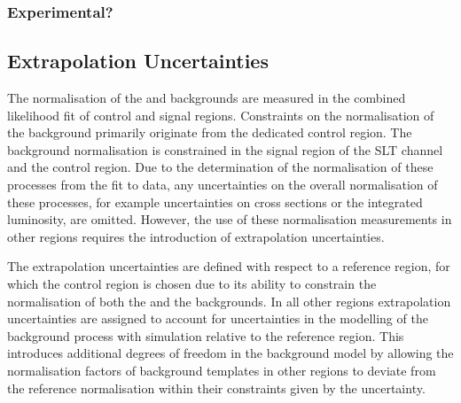 

\subsubsection{Experimental?}








\subsection{Extrapolation Uncertainties}

The normalisation of the \ZHF and \ttbar backgrounds are measured in
the combined likelihood fit of control and signal regions. Constraints
on the normalisation of the \ZHF background primarily originate from
the dedicated control region. The \ttbar background normalisation is
constrained in the signal region of the \lephad SLT channel and the
\ZHF control region. Due to the determination of the normalisation of
these processes from the fit to data, any uncertainties on the overall
normalisation of these processes, for example uncertainties on cross
sections or the integrated luminosity, are omitted. However, the use
of these normalisation measurements in other regions requires the
introduction of extrapolation uncertainties.

The extrapolation uncertainties are defined with respect to a
reference region, for which the \ZHF control region is chosen due to
its ability to constrain the normalisation of both the \ZHF and the
\ttbar backgrounds. In all other regions extrapolation uncertainties
are assigned to account for uncertainties in the modelling of the
background process with simulation relative to the reference
region. This introduces additional degrees of freedom in the
background model by allowing the normalisation factors of background
templates in other regions to deviate from the reference normalisation
within their constraints given by the uncertainty.


